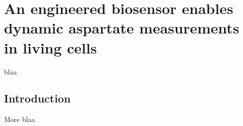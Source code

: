 \chapter{An engineered biosensor enables dynamic aspartate measurements in living cells}
blaa

\section{Introduction}
More blaa